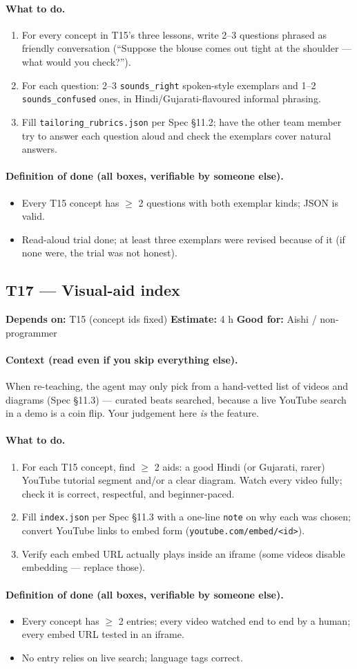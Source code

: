 \documentclass[11pt]{article}
\newcommand{\code}[1]{\texttt{#1}}
\newcommand{\taskmeta}[3]{\noindent\textbf{Depends on:} #1 \quad\textbullet\quad \textbf{Estimate:} #2 \quad\textbullet\quad \textbf{Good for:} #3\par\vspace{2pt}}
\newcommand{\ctx}[1]{\paragraph{Context (read even if you skip everything else).} #1}
\newcommand{\dod}{\paragraph{Definition of done (all boxes, verifiable by someone else).}}
\begin{document}
\paragraph{What to do.}
\begin{enumerate}
  \item For every concept in T15's three lessons, write 2--3 questions phrased as friendly conversation (``Suppose the blouse comes out tight at the shoulder --- what would you check?'').
  \item For each question: 2--3 \code{sounds\_right} spoken-style exemplars and 1--2 \code{sounds\_confused} ones, in Hindi/Gujarati-flavoured informal phrasing.
  \item Fill \code{tailoring\_rubrics.json} per Spec \S11.2; have the other team member try to answer each question aloud and check the exemplars cover natural answers.
\end{enumerate}
\dod
\begin{itemize}
  \item Every T15 concept has $\geq$ 2 questions with both exemplar kinds; JSON is valid.
  \item Read-aloud trial done; at least three exemplars were revised because of it (if none were, the trial was not honest).
\end{itemize}

\subsection{T17 --- Visual-aid index \dag}
\taskmeta{T15 (concept ids fixed)}{4 h}{Aishi / non-programmer}
\ctx{When re-teaching, the agent may only pick from a hand-vetted list of videos and diagrams (Spec \S11.3) --- curated beats searched, because a live YouTube search in a demo is a coin flip. Your judgement here \emph{is} the feature.}
\paragraph{What to do.}
\begin{enumerate}
  \item For each T15 concept, find $\geq$ 2 aids: a good Hindi (or Gujarati, rarer) YouTube tutorial segment and/or a clear diagram. Watch every video fully; check it is correct, respectful, and beginner-paced.
  \item Fill \code{index.json} per Spec \S11.3 with a one-line \code{note} on why each was chosen; convert YouTube links to embed form (\code{youtube.com/embed/<id>}).
  \item Verify each embed URL actually plays inside an iframe (some videos disable embedding --- replace those).
\end{enumerate}
\dod
\begin{itemize}
  \item Every concept has $\geq$ 2 entries; every video watched end to end by a human; every embed URL tested in an iframe.
  \item No entry relies on live search; language tags correct.
\end{itemize}
\end{document}
